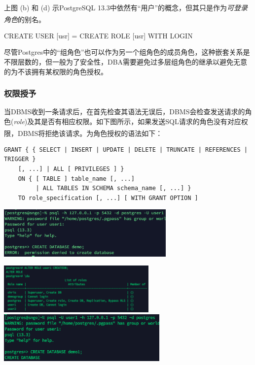 \indent 上图 (b) 和 (d) 
示PostgreSQL 13.3中依然有“用户”的概念，但其只是作为\emph{可登录角色}的别名\textsuperscript{\cite{psqldoc, unknown-author-2014}}。
\centerline{CREATE USER [usr] = CREATE ROLE [usr] WITH LOGIN}
\par
尽管Postgres中的“组角色”也可以作为另一个组角色的成员角色，这种嵌套关系是不限层数的，但一般为了安全性，DBA需要避免过多层组角色的继承以避免无意的为不该拥有某权限的角色授权。

\subsubsection{权限授予}
当DBMS收到一条请求后，在首先检查其语法无误后，DBMS会检查发送请求的角色(\emph{role})及其是否有相应权限。如下图所示，如果发送SQL请求的角色没有对应权限，DBMS将拒绝该请求。为角色授权的语法如下\textsuperscript{\cite{unknown-author-2021}}：
\begin{lstlisting}
GRANT { { SELECT | INSERT | UPDATE | DELETE | TRUNCATE | REFERENCES | TRIGGER }
    [, ...] | ALL [ PRIVILEGES ] }
    ON { [ TABLE ] table_name [, ...]
         | ALL TABLES IN SCHEMA schema_name [, ...] }
    TO role_specification [, ...] [ WITH GRANT OPTION ]
\end{lstlisting}
\vspace{-2em}

\centerline{\includegraphics[width=0.65\textwidth]{./pic/nopriv.png}}
\vspace{1em}
\centerline{\includegraphics[height=2.5cm]{./pic/cdb.png}\quad \includegraphics[height=2.5cm]{./pic/u1cdb.png}}

